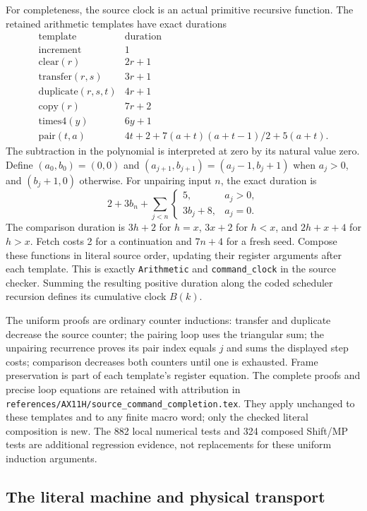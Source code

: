 For completeness, the source clock is an actual primitive recursive
function.  The retained arithmetic templates have exact durations
\[
\begin{array}{c|c}
 \mathrm{template}&\mathrm{duration}\\\hline
 \mathrm{increment}&1\\
 \mathrm{clear}(r)&2r+1\\
 \mathrm{transfer}(r,s)&3r+1\\
 \mathrm{duplicate}(r,s,t)&4r+1\\
 \mathrm{copy}(r)&7r+2\\
 \mathrm{times4}(y)&6y+1\\
 \mathrm{pair}(t,a)&4t+2+7(a+t)(a+t-1)/2+5(a+t).
\end{array}
\]
The subtraction in the polynomial is interpreted at zero by its natural
value zero.  Define $(a_0,b_0)=(0,0)$ and
$(a_{j+1},b_{j+1})=(a_j-1,b_j+1)$ when $a_j>0$, and
$(b_j+1,0)$ otherwise.  For unpairing input $n$, the exact duration is
\[
 2+3b_n+\sum_{j<n}
       \begin{cases}5,&a_j>0,\\3b_j+8,&a_j=0.\end{cases}
\]
The comparison duration is $3h+2$ for $h=x$, $3x+2$ for $h<x$,
and $2h+x+4$ for $h>x$.  Fetch costs 2 for a continuation and
$7n+4$ for a fresh seed.  Compose these functions in literal source
order, updating their register arguments after each template.  This is
exactly \texttt{Arithmetic} and \nolinkurl{command_clock} in the source
checker.  Summing the resulting positive duration along the coded
scheduler recursion defines its cumulative clock $B(k)$.

The uniform proofs are ordinary counter inductions: transfer and
duplicate decrease the source counter; the pairing loop uses the
triangular sum; the unpairing recurrence proves its pair index equals
$j$ and sums the displayed step costs; comparison decreases both
counters until one is exhausted.  Frame preservation is part of each
template's register equation.  The complete proofs and precise loop
equations are retained with attribution in
\nolinkurl{references/AX11H/source_command_completion.tex}.
They apply unchanged to these templates and to any finite macro word;
only the checked literal composition is new.  The 882 local numerical
tests and 324 composed Shift/MP tests are additional regression evidence,
not replacements for these uniform induction arguments.

\subsection{The literal machine and physical transport}

